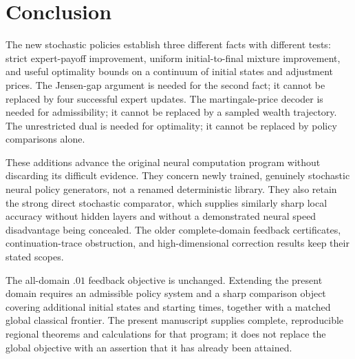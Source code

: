 \section{Conclusion}\label{sec:r21conclusion}
The new stochastic policies establish three different facts with different tests: strict expert-payoff improvement, uniform initial-to-final mixture improvement, and useful optimality bounds on a continuum of initial states and adjustment prices. The Jensen-gap argument is needed for the second fact; it cannot be replaced by four successful expert updates. The martingale-price decoder is needed for admissibility; it cannot be replaced by a sampled wealth trajectory. The unrestricted dual is needed for optimality; it cannot be replaced by policy comparisons alone.

These additions advance the original neural computation program without discarding its difficult evidence. They concern newly trained, genuinely stochastic neural policy generators, not a renamed deterministic library. They also retain the strong direct stochastic comparator, which supplies similarly sharp local accuracy without hidden layers and without a demonstrated neural speed disadvantage being concealed. The older complete-domain feedback certificates, continuation-trace obstruction, and high-dimensional correction results keep their stated scopes.

The all-domain $.01$ feedback objective is unchanged. Extending the present domain requires an admissible policy system and a sharp comparison object covering additional initial states and starting times, together with a matched global classical frontier. The present manuscript supplies complete, reproducible regional theorems and calculations for that program; it does not replace the global objective with an assertion that it has already been attained.
